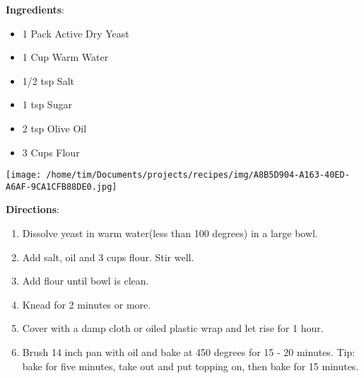 \documentclass[11pt, twoside, openany]{book}
\begin{document}
\begin{minipage}[t]{0.8\linewidth}
\textbf{Ingredients}:\vspace{-3mm}
\begin{multicols}{2}
\begin{itemize}\setlength\itemsep{-1mm}
\item 1 Pack Active Dry Yeast
\item 1 Cup Warm Water
\item 1/2 tsp Salt
\item 1 tsp Sugar
\item 2 tsp Olive Oil
\item 3 Cups Flour
\end{itemize}
\end{multicols}
\end{minipage}
\begin{minipage}[t]{0.2\linewidth}
\centering \strut\vspace*{-\baselineskip}\newline
\texttt{[image: /home/tim/Documents/projects/recipes/img/A8B5D904-A163-40ED-A6AF-9CA1CFB88DE0.jpg]}\\
\end{minipage}\vspace{3mm}
\textbf{Directions}:
\vspace{-3mm}\begin{enumerate}\setlength\itemsep{-1mm}
\item Dissolve yeast in warm water(less than 100 degrees) in a large bowl.
\item Add salt, oil and 3 cups flour. Stir well.
\item Add flour until bowl is clean. 
\item Knead for 2 minutes or more.
\item Cover with a damp cloth or oiled plastic wrap and let rise for 1 hour.
\item Brush 14 inch pan with oil and bake at 450 degrees for 15 - 20 minutes. Tip: bake for five minutes, take out and put topping on, then bake for 15 minutes.
\end{enumerate}
 \label{chicken-cordon-bleu}\hfill\textit{}\\
\end{document}
